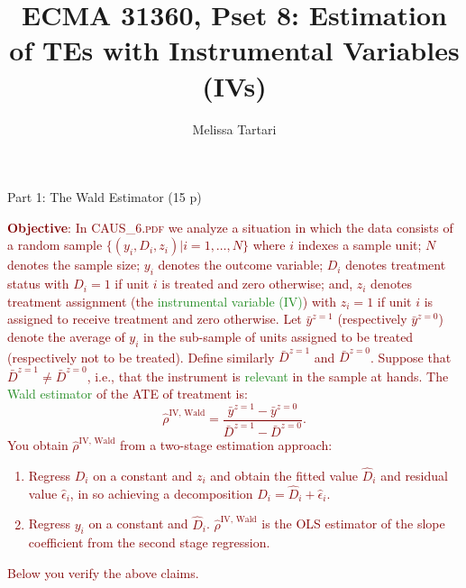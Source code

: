 \documentclass{article}
\newcommand{\psetnum}{8}
\begin{document}

\title{ECMA 31360, Pset \psetnum: Estimation of TEs with Instrumental Variables (IVs)}
\date{}
\author{Melissa Tartari}
\maketitle
\thispagestyle{fancy}

\begin{center}
{\LARGE Part 1: The Wald Estimator (15 p)}
\end{center}

\noindent \textcolor{Maroon}{\textbf{Objective}: In \textsc{CAUS\_6.pdf} we analyze a situation in which the data consists of a random sample $\{(y_i,D_i,z_i)|i=1,\ldots,N\}$ where $i$ indexes a sample unit; $N$ denotes the sample size; $y_i$ denotes the outcome variable; $D_i$ denotes treatment status with $D_i=1$ if unit $i$ is treated and zero otherwise; and, $z_i$ denotes treatment assignment (the \textcolor{ForestGreen}{instrumental variable (IV)}) with $z_i=1$ if unit $i$ is assigned to receive treatment and zero otherwise. Let $\bar{y}^{z=1}$ (respectively $\bar{y}^{z=0}$) denote the average of $y_i$ in the sub-sample of units assigned to be treated (respectively not to be treated). Define similarly $\bar{D}^{z=1}$ and $\bar{D}^{z=0}$. Suppose that $\bar{D}^{z=1} \neq \bar{D}^{z=0}$, i.e., that the instrument is \textcolor{ForestGreen}{relevant} in the sample at hands. The \textcolor{ForestGreen}{Wald estimator} of the ATE of treatment is: 
\begin{equation}
\hat{\rho}^{\text{IV, Wald}}  = \frac{\bar{y}^{z=1} - \bar{y}^{z=0}}{\bar{D}^{z=1} - \bar{D}^{z=0}}. \label{eq:wald}
\end{equation}
You obtain $\hat{\rho}^{\text{IV, Wald}}$ from a two-stage estimation approach:
\begin{enumerate}[label=\textbf{STAGE \arabic{enumi}}.,ref=STAGE\arabic{enumi}, wide=0pt, itemsep=0em, topsep=5pt, labelindent=0pt]
\item Regress $D_i$ on a constant and $z_i$ and obtain the fitted value $\hat{D}_i$ and residual value $\hat{\epsilon}_i$, in so achieving a decomposition $D_i = \hat{D}_i + \hat{\epsilon}_i$. 
\item Regress $y_i$ on a constant and $\hat{D}_i$. $\hat{\rho}^{\text{IV, Wald}}$ is the OLS estimator of the slope coefficient from the second stage regression. 
\end{enumerate}
Below you verify the above claims.}
\end{document}
